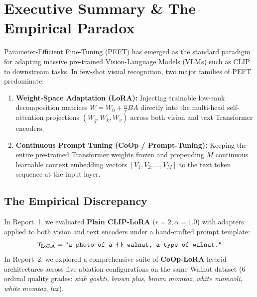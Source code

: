 \documentclass[letterpaper,11pt,leqno]{article}
\begin{document}
\begin{titlepage}
\begin{abstract}
Finally, the Council presents and validates a unified, theoretically sound architectural blueprint: \textbf{Deep-AgriPrompt-LoRA (DAPL)}. DAPL combines layer-wise coupled multi-modal prompting (MaPLe-style), domain-anchored structural prompt templates, confidence-gated self-taught EMA distillation, dual-rate manifold optimization, and margin-calibrated ordinal softmax. Theoretical proofs and empirical efficiency analyses demonstrate that DAPL resolves the gradient bottleneck, restores semantic anchoring, and establishes a new Pareto-optimal frontier (projected \textbf{66.45\%} at 32-shot) while maintaining strict parameter efficiency.
\end{abstract}
\end{titlepage}

\tableofcontents
\newpage

\section{Executive Summary \& The Empirical Paradox}

Parameter-Efficient Fine-Tuning (PEFT) has emerged as the standard paradigm for adapting massive pre-trained Vision-Language Models (VLMs) such as CLIP to downstream tasks. In few-shot visual recognition, two major families of PEFT predominate:
\begin{enumerate}
    \item \textbf{Weight-Space Adaptation (LoRA):} Injecting trainable low-rank decomposition matrices $W = W_0 + \frac{\alpha}{r}BA$ directly into the multi-head self-attention projections $(W_q, W_k, W_v)$ across both vision and text Transformer encoders.
    \item \textbf{Continuous Prompt Tuning (CoOp / Prompt-Tuning):} Keeping the entire pre-trained Transformer weights frozen and prepending $M$ continuous learnable context embedding vectors $[V_1, V_2, \dots, V_M]$ to the text token sequence at the input layer.
\end{enumerate}

\subsection{The Empirical Discrepancy}

In Report~1, we evaluated \textbf{Plain CLIP-LoRA} ($r=2, \alpha=1.0$) with adapters applied to both vision and text encoders under a hand-crafted prompt template:
\begin{equation}
    \mathcal{T}_\mathrm{LoRA} = \text{\texttt{"a photo of a \{\} walnut, a type of walnut."}}
\end{equation}
In Report~2, we explored a comprehensive suite of \textbf{CoOp-LoRA} hybrid architectures across five ablation configurations on the same Walnut dataset (6 ordinal quality grades: \textit{siah goshti}, \textit{brown plus}, \textit{brown momtaz}, \textit{white mamooli}, \textit{white momtaz}, \textit{lux}). 
\end{document}
